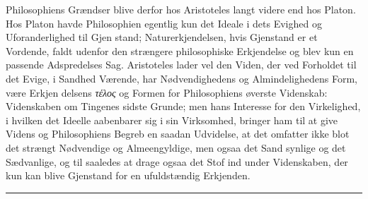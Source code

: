 \documentclass[12pt,a4paper]{book}
\newcommand{\divrule}{\begin{center}\rule{2cm}{0.4pt}\end{center}}
\newcommand{\gk}[1]{\textit{#1}}
\begin{document}
Philosophiens Grændser blive derfor hos Aristoteles langt videre
end hos Platon. Hos Platon havde Philosophien egentlig
kun det Ideale i dets Evighed og Uforanderlighed til Gjen\-%
stand; Naturerkjendelsen, hvis Gjenstand er et Vordende, faldt
udenfor den strængere philosophiske Erkjendelse og blev kun
en passende Adspredelses Sag. Aristoteles lader vel den
Viden, der ved Forholdet til det Evige, i Sandhed Værende,
har Nødvendighedens og Almindelighedens Form, være Erkjen\-%
delsens \gk{τέλος} og Formen for Philosophiens øverste Videnskab:
Videnskaben om Tingenes sidste Grunde; men hans Interesse
for den Virkelighed, i hvilken det Ideelle aabenbarer sig i sin
Virksomhed, bringer ham til at give Videns og Philosophiens
Begreb en saadan Udvidelse, at det omfatter ikke blot det
strængt Nødvendige og Almeengyldige, men ogsaa det Sand\-%
synlige og det Sædvanlige, og til saaledes at drage ogsaa det
Stof ind under Videnskaben, der kun kan blive Gjenstand for
en ufuldstændig Erkjenden.

\divrule
\end{document}
